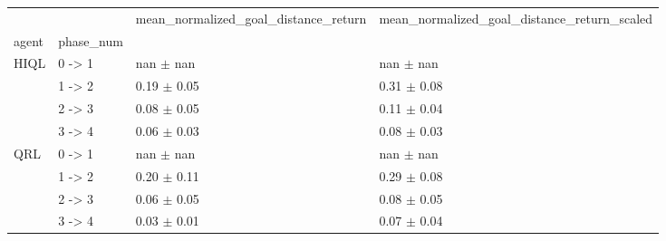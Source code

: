 \begin{tabular}{llll}
\toprule
 &  & mean_normalized_goal_distance_return & mean_normalized_goal_distance_return_scaled \\
agent & phase_num &  &  \\
\midrule
\multirow[t]{4}{*}{HIQL} & 0 -> 1 & nan $\pm$ nan & nan $\pm$ nan \\
 & 1 -> 2 & 0.19 $\pm$ 0.05 & 0.31 $\pm$ 0.08 \\
 & 2 -> 3 & 0.08 $\pm$ 0.05 & 0.11 $\pm$ 0.04 \\
 & 3 -> 4 & 0.06 $\pm$ 0.03 & 0.08 $\pm$ 0.03 \\
\cline{1-4}
\multirow[t]{4}{*}{QRL} & 0 -> 1 & nan $\pm$ nan & nan $\pm$ nan \\
 & 1 -> 2 & 0.20 $\pm$ 0.11 & 0.29 $\pm$ 0.08 \\
 & 2 -> 3 & 0.06 $\pm$ 0.05 & 0.08 $\pm$ 0.05 \\
 & 3 -> 4 & 0.03 $\pm$ 0.01 & 0.07 $\pm$ 0.04 \\
\cline{1-4}
\bottomrule
\end{tabular}
